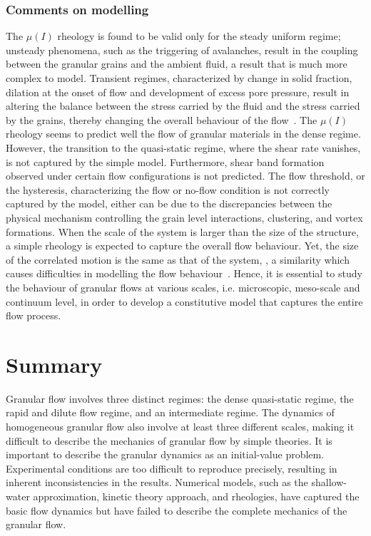 \newpage

\subsubsection{Comments on modelling}

The $\mu(\textit{I})$ rheology is found to be valid only for the steady uniform 
regime; unsteady phenomena, such as the triggering of avalanches, result in the
coupling between the granular grains and the ambient fluid, a result that is 
much more complex to model. Transient regimes, characterized by change in solid 
fraction, dilation at the onset of flow and development of excess pore 
pressure, result in altering the balance between the stress carried by the 
fluid and the stress 
carried by the grains, thereby changing the overall behaviour of the 
flow~\citep{Denlinger2001}. The $\mu (I)$ rheology seems to predict well the 
flow of granular materials in the dense regime. However, the transition to the 
quasi-static regime, where the shear rate vanishes, is not captured by the 
simple model. Furthermore, shear band formation observed under certain flow 
configurations is not predicted. The flow threshold, or the hysteresis, 
characterizing the flow or no-flow condition is not correctly captured by the 
model, either can be due to the discrepancies between the physical mechanism 
controlling the grain level interactions, clustering, and vortex formations. 
When the scale of the system is larger than the size of the structure, a simple 
rheology is expected to capture the overall flow behaviour. Yet, the size of 
the correlated motion is the same as that of the system, , a similarity which 
causes difficulties in modelling the flow behaviour~\citep{Pouliquen2005}. 
Hence, it is essential 
to study the behaviour of granular flows at various scales, i.e. microscopic, 
meso-scale and continuum level, in order to develop a constitutive model 
that captures the entire flow process.

\section{Summary}
Granular flow involves three distinct regimes: the dense quasi-static regime, 
the rapid and dilute flow regime, and an intermediate regime. The dynamics of 
homogeneous granular flow also involve at least three different scales, making 
it difficult to describe the mechanics of granular flow by simple theories. It 
is important to describe the granular dynamics as an initial-value problem. 
Experimental conditions are too difficult to reproduce precisely, 
resulting in inherent inconsistencies in the results. Numerical models, such as 
the shallow-water approximation, kinetic theory approach, and rheologies, have 
captured the basic flow dynamics but have failed to describe 
the complete mechanics of the granular flow.


